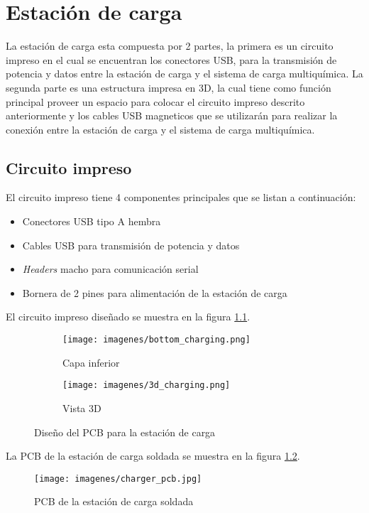     
        


\chapter{Estación de carga}

La estación de carga esta compuesta por 2 partes, la primera es un circuito impreso
en el cual se encuentran los conectores USB, para la transmisión de potencia y 
datos entre la estación de carga y el sistema de carga multiquímica. La segunda
parte es una estructura impresa en 3D, la cual tiene como función principal
proveer un espacio para colocar el circuito impreso descrito anteriormente y 
los cables USB magneticos que se utilizarán para realizar la conexión entre
la estación de carga y el sistema de carga multiquímica.


\section{Circuito impreso}

El circuito impreso tiene 4 componentes principales que se listan a continuación:

\begin{itemize}
    \item Conectores USB tipo A hembra
    \item Cables USB para transmisión de potencia y datos
    \item \textit{Headers} macho para comunicación serial
    \item Bornera de 2 pines para alimentación de la estación de carga
\end{itemize}
El circuito impreso diseñado se muestra en la figura \ref{fig:pcb_estacion_carga}.

\begin{figure}[H]
    \centering
    \begin{subfigure}{0.9\linewidth}
        \centering
        \texttt{[image: imagenes/bottom\_charging.png]}
        \caption{Capa inferior}
    \end{subfigure}
    \vfill
    \begin{subfigure}{0.9\linewidth}
        \centering
        \texttt{[image: imagenes/3d\_charging.png]}
        \caption{Vista 3D}
    \end{subfigure}
    \caption{Diseño del PCB para la estación de carga}
    \label{fig:pcb_estacion_carga}
\end{figure}

La PCB de la estación de carga soldada se muestra en la figura \ref{fig:pcb_estacion_carga_soldada}.

\begin{figure}[H]
    \centering
    \texttt{[image: imagenes/charger\_pcb.jpg]}
    \caption{PCB de la estación de carga soldada}
    \label{fig:pcb_estacion_carga_soldada}
\end{figure}